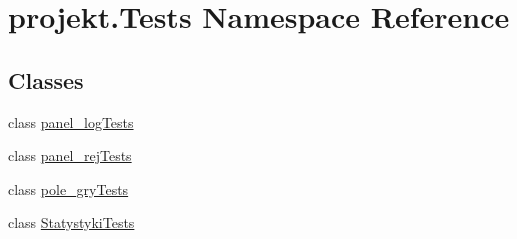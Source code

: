 \hypertarget{namespaceprojekt_1_1_tests}{}\section{projekt.\+Tests Namespace Reference}
\label{namespaceprojekt_1_1_tests}
\subsection*{Classes}
\begin{DoxyCompactItemize}
\item 
class \mbox{\hyperlink{classprojekt_1_1_tests_1_1panel__log_tests}{panel\+\_\+log\+Tests}}
\item 
class \mbox{\hyperlink{classprojekt_1_1_tests_1_1panel__rej_tests}{panel\+\_\+rej\+Tests}}
\item 
class \mbox{\hyperlink{classprojekt_1_1_tests_1_1pole__gry_tests}{pole\+\_\+gry\+Tests}}
\item 
class \mbox{\hyperlink{classprojekt_1_1_tests_1_1_statystyki_tests}{Statystyki\+Tests}}
\end{DoxyCompactItemize}
